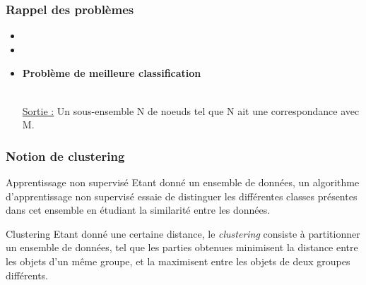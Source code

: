 \documentclass{beamer}
\begin{document}
\begin{frame}
\frametitle{Rappel des problèmes}

\begin{itemize}
\item {}
\item {}
\item \begin{flushcenter} \bf Problème de meilleure classification\end{flushcenter}\\ \uline{Sortie :} Un sous-ensemble N de noeuds tel que N ait une correspondance avec M.

\end{itemize}

\end{frame}

\begin{frame}
\frametitle{Notion de clustering}


\begin{block}{Apprentissage non supervisé}
Etant donné un ensemble de données, un algorithme d'\alert{apprentissage non supervisé} essaie de distinguer les différentes classes présentes dans cet ensemble en étudiant la similarité entre les données.
\end{block}

\pause


\begin{block}{Clustering}
Etant donné une certaine distance, le \alert{\it clustering} consiste à partitionner un ensemble de données, tel que les parties obtenues \alert{minimisent} la distance entre les objets d'un même groupe, et la \alert{maximisent} entre les objets de deux groupes différents.
\end{block}

\end{frame}
\end{document}
